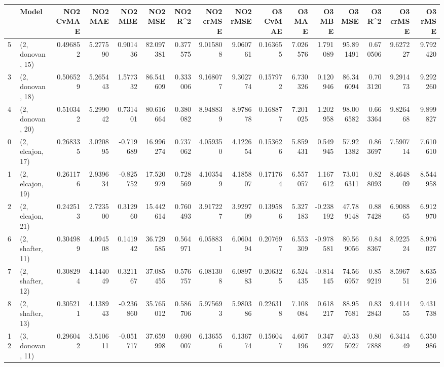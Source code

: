 \begin{tabular}{llrrrrrrrrrrrrrr}
\toprule
{} &             Model &  NO2 CvMAE &   NO2 MAE &   NO2 MBE &    NO2 MSE &   NO2 R\textasciicircum2 &  NO2 crMSE &  NO2 rMSE &  O3 CvMAE &    O3 MAE &    O3 MBE &      O3 MSE &    O3 R\textasciicircum2 &   O3 crMSE &    O3 rMSE \\
\midrule
5  &  (2, donovan, 15) &   0.496852 &  5.277590 &  0.901436 &  82.097381 &  0.377575 &   9.015808 &  9.060761 &  0.163655 &  7.026576 &  1.791089 &   95.891491 &  0.670506 &   9.627227 &   9.792420 \\
3  &  (2, donovan, 18) &   0.506529 &  5.265443 &  1.577332 &  86.541609 &  0.333006 &   9.168077 &  9.302774 &  0.157972 &  6.730326 &  0.120946 &   86.346094 &  0.703120 &   9.291473 &   9.292260 \\
4  &  (2, donovan, 20) &   0.510342 &  5.299042 &  0.731401 &  80.616664 &  0.380082 &   8.948839 &  8.978678 &  0.168877 &  7.201025 &  1.202958 &   98.006582 &  0.663364 &   9.826468 &   9.899827 \\
0  &  (2, elcajon, 17) &   0.268335 &  3.020895 & -0.719689 &  16.996274 &  0.737062 &   4.059350 &  4.122654 &  0.153626 &  5.859431 &  0.549945 &   57.921382 &  0.863697 &   7.590714 &   7.610610 \\
1  &  (2, elcajon, 19) &   0.261176 &  2.939634 & -0.825752 &  17.520979 &  0.728569 &   4.103549 &  4.185807 &  0.171764 &  6.557057 &  1.167612 &   73.016311 &  0.828093 &   8.464809 &   8.544958 \\
2  &  (2, elcajon, 21) &   0.242513 &  2.723500 &  0.312960 &  15.442614 &  0.760493 &   3.917227 &  3.929709 &  0.139586 &  5.327183 & -0.238192 &   47.789148 &  0.887428 &   6.908865 &   6.912970 \\
6  &  (2, shafter, 11) &   0.304989 &  4.094508 &  0.141942 &  36.729585 &  0.564971 &   6.058831 &  6.060494 &  0.207697 &  6.553309 & -0.978581 &   80.569056 &  0.848367 &   8.922524 &   8.976027 \\
7  &  (2, shafter, 12) &   0.308294 &  4.144049 &  0.321167 &  37.085455 &  0.576757 &   6.081308 &  6.089783 &  0.206325 &  6.524435 & -0.814145 &   74.566957 &  0.859219 &   8.596751 &   8.635216 \\
8  &  (2, shafter, 13) &   0.305211 &  4.138943 & -0.236860 &  35.765012 &  0.586706 &   5.975693 &  5.980386 &  0.226318 &  7.108084 &  0.618217 &   88.957681 &  0.832843 &   9.411455 &   9.431738 \\
12 &  (3, donovan, 11) &   0.296042 &  3.510611 & -0.051717 &  37.659998 &  0.690007 &   6.136556 &  6.136774 &  0.156047 &  4.667196 &  0.347927 &   40.335027 &  0.807888 &   6.341449 &   6.350986 \\

\end{tabular}
